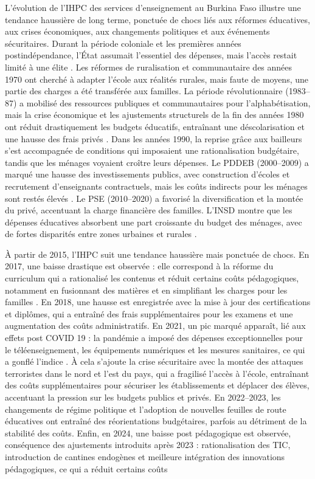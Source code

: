 \documentclass[
12pt,          %
a4paper,       %
oneside,       %
openright      %
]{report}
\begin{document}
L’évolution de l’IHPC des services d’enseignement au Burkina Faso illustre une tendance haussière de long terme, ponctuée de chocs liés aux réformes éducatives, aux crises économiques, aux changements politiques et aux événements sécuritaires. Durant la période coloniale et les premières années postindépendance, l’État assumait l’essentiel des dépenses, mais l’accès restait limité à une élite \citep {sore2014logiques}. Les réformes de ruralisation et communautaire des années 1970 ont cherché à adapter l’école aux réalités rurales, mais faute de moyens, une partie des charges a été transférée aux familles\citep {sore2014logiques}.
La période révolutionnaire (1983–87) a mobilisé des ressources publiques et communautaires pour l’alphabétisation, mais la crise économique et les ajustements structurels de la fin des années 1980 ont réduit drastiquement les budgets éducatifs, entraînant une déscolarisation et une hausse des frais privés \citep {sore2014logiques}.
Dans les années 1990, la reprise grâce aux bailleurs s’est accompagnée de conditions qui imposaient une rationalisation budgétaire, tandis que les ménages voyaient croître leurs dépenses\cite{Pilon2004}.
Le PDDEB (2000–2009) a marqué une hausse des investissements publics, avec construction d’écoles et recrutement d’enseignants contractuels, mais les coûts indirects pour les ménages sont restés élevés \cite{INSD2001}.
Le PSE (2010–2020) a favorisé la diversification et la montée du privé, accentuant la charge financière des familles.
 L’INSD montre que les dépenses éducatives absorbent une part croissante du budget des ménages, avec de fortes disparités entre zones urbaines et rurales \cite{INSD2001}.

À partir de 2015, l’IHPC suit une tendance haussière mais ponctuée de chocs. En 2017, une baisse drastique est observée : elle correspond à la réforme du curriculum qui a rationalisé les contenus et réduit certains coûts pédagogiques, notamment en fusionnant des matières et en simplifiant les charges pour les familles \cite{INSD2001}.
En 2018, une hausse est enregistrée avec la mise à jour des certifications et diplômes, qui a entraîné des frais supplémentaires pour les examens et une augmentation des coûts administratifs.
En 2021, un pic marqué apparaît, lié aux effets post COVID 19 : la pandémie a imposé des dépenses exceptionnelles pour le téléenseignement, les équipements numériques et les mesures sanitaires, ce qui a gonflé l’indice \cite{unicef2021radio}.
À cela s’ajoute la crise sécuritaire avec la montée des attaques terroristes dans le nord et l’est du pays, qui a fragilisé l’accès à l’école, entraînant des coûts supplémentaires pour sécuriser les établissements et déplacer des élèves, accentuant la pression sur les budgets publics et privés.
 En 2022–2023, les changements de régime politique et l’adoption de nouvelles feuilles de route éducatives ont entraîné des réorientations budgétaires, parfois au détriment de la stabilité des coûts.
Enfin, en 2024, une baisse post pédagogique est observée, conséquence des ajustements introduits après 2023 : rationalisation des TIC, introduction de cantines endogènes et meilleure intégration des innovations pédagogiques, ce qui a réduit certains coûts 
\end{document}
